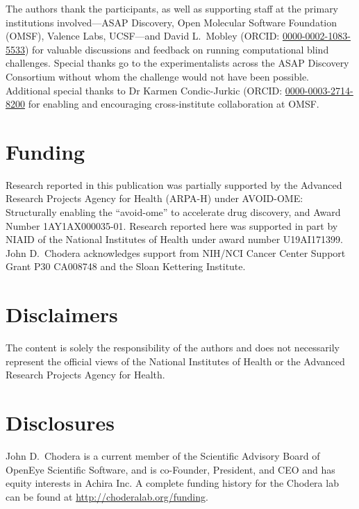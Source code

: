 \documentclass[journal=jcim,manuscript=article]{achemso}
\begin{document}
The authors thank the participants, as well as supporting staff at the primary institutions involved---ASAP Discovery, Open Molecular Software Foundation (OMSF), Valence Labs, UCSF---and David L.\ Mobley (ORCID: \href{https://orcid.org/0000-0002-1083-5533}{0000-0002-1083-5533}) for valuable discussions and feedback on running computational blind challenges. Special thanks go to the experimentalists across the ASAP Discovery Consortium without whom the challenge would not have been possible. Additional special thanks to Dr Karmen Condic-Jurkic (ORCID: \href{https://orcid.org/0000-0003-2714-8200}{0000-0003-2714-8200} for enabling and encouraging cross-institute collaboration at OMSF.

\section{Funding}

Research reported in this publication was partially supported by the Advanced Research Projects Agency for Health (ARPA-H) under AVOID-OME: Structurally enabling the “avoid-ome” to accelerate drug discovery, and Award Number 1AY1AX000035-01. 
Research reported here was supported in part by NIAID of the National Institutes of Health under award number U19AI171399.
John D.\ Chodera acknowledges support from NIH/NCI Cancer Center Support Grant P30 CA008748 and the Sloan Kettering Institute.

\section{Disclaimers}
The content is solely the responsibility of the authors and does not necessarily represent the official views of the National Institutes of Health or the Advanced Research Projects Agency for Health.

\section{Disclosures}
John D.\ Chodera is a current member of the Scientific Advisory Board of OpenEye Scientific Software, and is co-Founder, President, and CEO and has equity interests in Achira Inc.
A complete funding history for the Chodera lab can be found at \url{http://choderalab.org/funding}.
\end{document}
